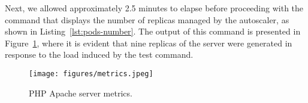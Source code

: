 Next, we allowed approximately 2.5 minutes to elapse before proceeding with the command that displays the number of replicas managed by the autoscaler, as shown in Listing~\ref{lst:pods-number}. The output of this command is presented in Figure~\ref{fig:metrics}, where it is evident that nine replicas of the server were generated in response to the load induced by the test command.

\begin{figure}[htbp]
  \centering
  \texttt{[image: figures/metrics.jpeg]}
  \caption{PHP Apache server metrics.}
  \label{fig:metrics}
\end{figure}